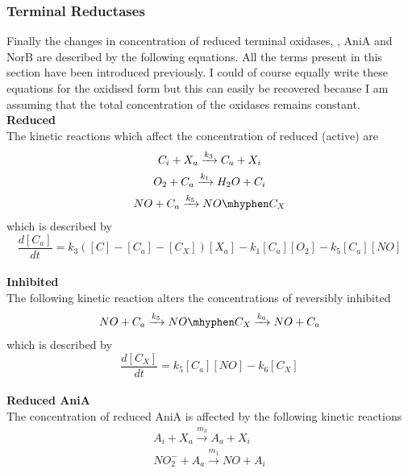 \subsubsection{Terminal Reductases}
Finally the changes in concentration of reduced terminal oxidases, \cbbthree{}, AniA and NorB are described by the following equations. All the terms present in this section have been introduced previously. I could of course equally write these equations for the oxidised form but this can easily be recovered because I am assuming that the total concentration of the oxidases remains constant.\\
{\bf Reduced \cbbthree{}}\\
The kinetic reactions which affect the concentration of reduced (active) \cbbthree{} are
\begin{equation*}
\begin{gathered}
C_i + X_a \xrightarrow{k_3} C_a + X_i\\
O_2 + C_a\xrightarrow{k_1} H_{2}O + C_i\\
NO + C_a \xrightarrow{k_5} NO\mhyphen C_X 
\end{gathered}
\end{equation*}
which is described by
\begin{equation}
\frac{d[C_a]}{dt} = k_3([C] - [C_a] - [C_X])[X_a] - k_{1}[C_a][O_2] - k_5[C_a][NO]
\label{eq:active_cbb3}
\end{equation}
\\
{\bf Inhibited \cbbthree{}}\\
The following kinetic reaction alters the concentrations of reversibly inhibited \cbbthree{}
\begin{equation*}
\begin{gathered}
 NO + C_a \xrightarrow{k_5} NO\mhyphen C_X \xrightarrow{k_6} NO + C_a
\end{gathered}
\end{equation*}
which is described by
\begin{equation}
\frac{d[C_X]}{dt} = k_5[C_a][NO] - k_6 [C_X]
\label{eq:NO inhibited_cbb3}
\end{equation}
\\
{\bf Reduced AniA}\\
The concentration of reduced AniA is affected by the following kinetic reactions
\begin{equation*}
\begin{gathered}
A_i + X_a \xrightarrow{m_3} A_a + X_i \\
NO_2^- + A_a \xrightarrow{m_1} NO + A_i 
\end{gathered}
\end{equation*}
